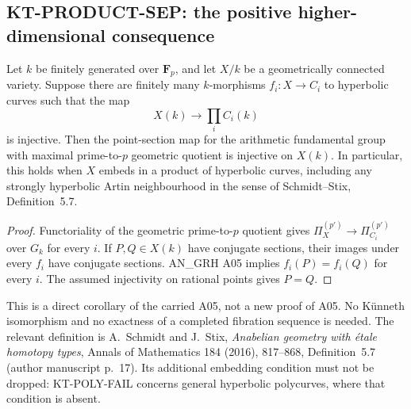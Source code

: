 \subsection{KT-PRODUCT-SEP: the positive higher-dimensional consequence}
\label{sec:kt-product-sep}

\begin{proposition}
Let $k$ be finitely generated over $\mathbf F_p$, and let $X/k$
be a geometrically connected variety. Suppose there are finitely
many $k$-morphisms $f_i:X\to C_i$ to hyperbolic curves such that
the map
\[
 X(k)\longrightarrow\prod_i C_i(k)
\]
is injective. Then the point-section map for the arithmetic
fundamental group with maximal prime-to-$p$ geometric quotient
is injective on $X(k)$.
In particular, this holds when $X$ embeds in a product of
hyperbolic curves, including any strongly hyperbolic Artin
neighbourhood in the sense of Schmidt--Stix, Definition~5.7.
\end{proposition}

\begin{proof}
Functoriality of the geometric prime-to-$p$ quotient gives
$\Pi_X^{(p')}\to\Pi_{C_i}^{(p')}$ over $G_k$ for every $i$.
If $P,Q\in X(k)$ have conjugate sections, their images under
every $f_i$ have conjugate sections. AN\_GRH A05 implies
$f_i(P)=f_i(Q)$ for every $i$. The assumed injectivity on
rational points gives $P=Q$.
\end{proof}

This is a direct corollary of the carried A05, not a new proof
of A05. No K\"unneth isomorphism and no exactness of a completed
fibration sequence is needed. The relevant definition is
A.~Schmidt and J.~Stix, \emph{Anabelian geometry with \'etale
homotopy types}, Annals of Mathematics 184 (2016), 817--868,
Definition~5.7 (author manuscript p.~17). Its additional
embedding condition must not be dropped: KT-POLY-FAIL concerns
general hyperbolic polycurves, where that condition is absent.


